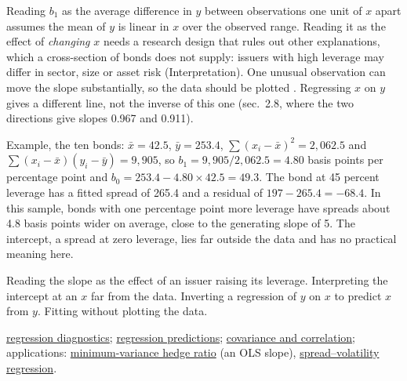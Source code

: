 \begin{qfmethod}
Reading $b_1$ as the average difference in $y$ between observations one unit of $x$ apart assumes the mean of $y$ is linear in $x$ over the observed range. Reading it as the effect of \emph{changing} $x$ needs a research design that rules out other explanations, which a cross-section of bonds does not supply: issuers with high leverage may differ in sector, size or asset risk (Interpretation). One unusual observation can move the slope substantially, so the data should be plotted \citep[sec.~1.8, Caution~3]{regression-methods-course-notes}. Regressing $x$ on $y$ gives a different line, not the inverse of this one (sec.~2.8, where the two directions give slopes 0.967 and 0.911).

 Example, the ten bonds: $\bar x=42.5$, $\bar y=253.4$, $\sum(x_i-\bar x)^2=2{,}062.5$ and $\sum(x_i-\bar x)(y_i-\bar y)=9{,}905$, so $b_1=9{,}905/2{,}062.5=4.80$ basis points per percentage point and $b_0=253.4-4.80\times42.5=49.3$. The bond at 45 percent leverage has a fitted spread of 265.4 and a residual of $197-265.4=-68.4$. In this sample, bonds with one percentage point more leverage have spreads about 4.8 basis points wider on average, close to the generating slope of 5. The intercept, a spread at zero leverage, lies far outside the data and has no practical meaning here.

 Reading the slope as the effect of an issuer raising its leverage. Interpreting the intercept at an $x$ far from the data. Inverting a regression of $y$ on $x$ to predict $x$ from $y$. Fitting without plotting the data.

 \hyperref[meth:regression-diagnostics-anova]{regression diagnostics}; \hyperref[meth:regression-prediction-functional-form]{regression predictions}; \hyperref[def:return-dependence]{covariance and correlation}; applications: \hyperref[mod:minimum-variance-hedge-ratio]{minimum-variance hedge ratio} (an OLS slope), \hyperref[meth:spread-volatility-regression]{spread--volatility regression}.

\end{qfmethod}

